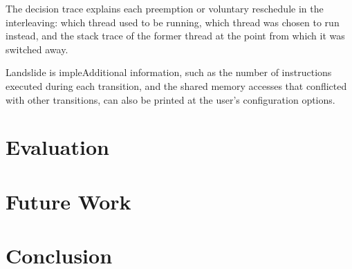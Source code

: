\documentclass[10pt,twocolumn]{article}
\begin{document}
The decision trace explains each preemption or voluntary reschedule in the interleaving: which thread used to be running, which thread was chosen to run instead, and the stack trace of the former thread at the point from which it was switched away.


Landslide is impleAdditional information, such as the number of instructions executed during each transition, and the shared memory accesses that conflicted with other transitions, can also be printed at the user's configuration options.



\section{Evaluation}

\section{Future Work}

\section{Conclusion}
\end{document}
